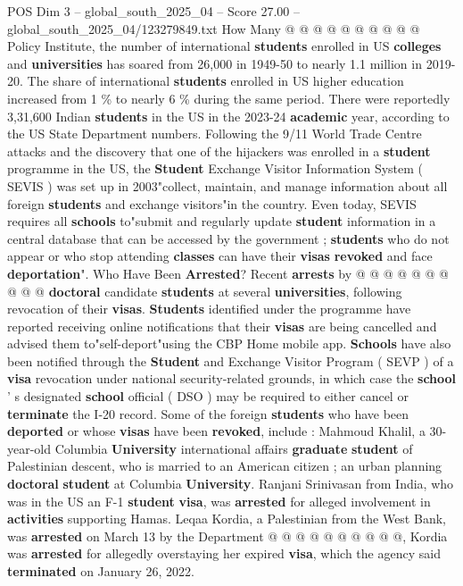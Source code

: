 \begin{textsample}{POS Dim 3 – global\_south\_2025\_04 – Score 27.00 – global\_south\_2025\_04/123279849.txt}
How Many @ @ @ @ @ @ @ @ @ @ Policy Institute, the number of international \textbf{students} enrolled in US \textbf{colleges} and \textbf{universities} has soared from 26,000 in 1949-50 to nearly 1.1 million in 2019-20.
The share of international \textbf{students} enrolled in US higher education increased from 1 \% to nearly 6 \% during the same period.
There were reportedly 3,31,600 Indian \textbf{students} in the US in the 2023-24 \textbf{academic} year, according to the US State Department numbers.
Following the 9/11 World Trade Centre attacks and the discovery that one of the hijackers was enrolled in a \textbf{student} programme in the US, the \textbf{Student} Exchange Visitor Information System ( SEVIS ) was set up in 2003"collect, maintain, and manage information about all foreign \textbf{students} and exchange visitors"in the country.
Even today, SEVIS requires all \textbf{schools} to"submit and regularly update \textbf{student} information in a central database that can be accessed by the government ; \textbf{students} who do not appear or who stop attending \textbf{classes} can have their \textbf{visas} \textbf{revoked} and face \textbf{deportation}".
Who Have Been \textbf{Arrested}?
Recent \textbf{arrests} by @ @ @ @ @ @ @ @ @ @ \textbf{doctoral} candidate \textbf{students} at several \textbf{universities}, following revocation of their \textbf{visas}. \textbf{Students} identified under the programme have reported receiving online notifications that their \textbf{visas} are being cancelled and advised them to"self-deport"using the CBP Home mobile app. \textbf{Schools} have also been notified through the \textbf{Student} and Exchange Visitor Program ( SEVP ) of a \textbf{visa} revocation under national security-related grounds, in which case the \textbf{school} ' s designated \textbf{school} official ( DSO ) may be required to either cancel or \textbf{terminate} the I-20 record.
Some of the foreign \textbf{students} who have been \textbf{deported} or whose \textbf{visas} have been \textbf{revoked}, include : Mahmoud Khalil, a 30-year-old Columbia \textbf{University} international affairs \textbf{graduate} \textbf{student} of Palestinian descent, who is married to an American citizen ; an urban planning \textbf{doctoral} \textbf{student} at Columbia \textbf{University}.
Ranjani Srinivasan from India, who was in the US an F-1 \textbf{student} \textbf{visa}, was \textbf{arrested} for alleged involvement in \textbf{activities} supporting Hamas.
Leqaa Kordia, a Palestinian from the West Bank, was \textbf{arrested} on March 13 by the Department @ @ @ @ @ @ @ @ @ @, Kordia was \textbf{arrested} for allegedly overstaying her expired \textbf{visa}, which the agency said \textbf{terminated} on January 26, 2022.

\end{textsample}
